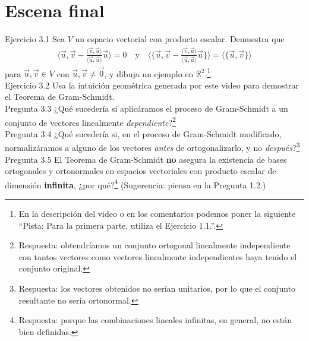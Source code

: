 \documentclass[12pt,dvipsnames]{article}
\numberwithin{equation}{section}
\begin{document}

\newpage
\section{Escena final}

Ejercicio 3.1 Sea $V$ un espacio vectorial con producto escalar. Demuestra que
\begin{align*}
    \bigg\langle \vec{u}, \vec{v} - \frac{\langle \vec{v}, \vec{u}\rangle}{\langle \vec{u} , \vec{u} \rangle}\vec{u} \bigg\rangle = 0 \quad \text{y} \quad \bigg\langle \bigg\{\vec{u}, \vec{v} - \frac{\langle \vec{v}, \vec{u}\rangle}{\langle \vec{u} , \vec{u} \rangle}\vec{u} \bigg\} \bigg\rangle = \langle \{\vec{u}, \vec{v}\} \rangle
\end{align*} para $\vec{u},\vec{v}\in V$ con $\vec{u},\vec{v}\neq\vec{0}$, y dibuja un ejemplo en $\mathbb{R}^2$.\footnote{En la descripción del video o en los comentarios podemos poner la siguiente ``Pista: Para la primera parte, utiliza el Ejercicio 1.1.''.}\\

Ejercicio 3.2 Usa la intuición geométrica generada por este video para demostrar el Teorema de Gram-Schmidt.\\

Pregunta 3.3 ¿Qué sucedería si aplicáramos el proceso de Gram-Schmidt a un conjunto de vectores linealmente \emph{dependiente}?\footnote{Respuesta: obtendríamos un conjunto ortogonal linealmente independiente con tantos vectores como vectores linealmente independientes haya tenido el conjunto original.} \\

Pregunta 3.4 ¿Qué sucedería si, en el proceso de Gram-Schmidt modificado, normalizáramos a alguno de los vectores \emph{antes} de ortogonalizarlo, y no \emph{después}?\footnote{Respuesta: los vectores obtenidos no serían unitarios, por lo que el conjunto resultante no sería ortonormal.} \\

Pregunta 3.5 El Teorema de Gram-Schmidt \textbf{no} asegura la existencia de bases ortogonales y ortonormales en espacios vectoriales con producto escalar de dimensión \textbf{infinita}, ¿por qué?\footnote{Respuesta: porque las combinaciones lineales infinitas, en general, no están bien definidas.} (Sugerencia: piensa en la Pregunta 1.2.)
\end{document}
